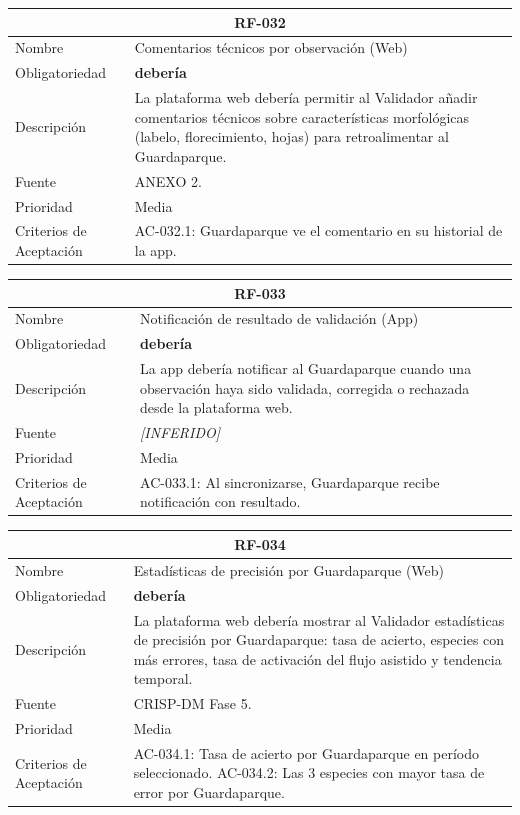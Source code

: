 \documentclass[12pt, a4paper]{article}
\newcommand{\inferido}{\textcolor{medio}{\textit{[INFERIDO]}}}
\begin{document}
\begin{longtable}{|p{3cm}|p{11.5cm}|}
\hline
\multicolumn{2}{|c|}{\textbf{RF-032}} \\
\hline
Nombre & Comentarios t\'ecnicos por observaci\'on (Web) \\
\hline
Obligatoriedad & \textbf{deber\'ia} \\
\hline
Descripci\'on & La plataforma web deber\'ia permitir al Validador a\~nadir comentarios t\'ecnicos sobre caracter\'isticas morfol\'ogicas (labelo, florecimiento, hojas) para retroalimentar al Guardaparque. \\
\hline
Fuente & ANEXO 2. \\
\hline
Prioridad & Media \\
\hline
Criterios de Aceptaci\'on &
AC-032.1: Guardaparque ve el comentario en su historial de la app. \\
\hline
\end{longtable}

\begin{longtable}{|p{3cm}|p{11.5cm}|}
\hline
\multicolumn{2}{|c|}{\textbf{RF-033}} \\
\hline
Nombre & Notificaci\'on de resultado de validaci\'on (App) \\
\hline
Obligatoriedad & \textbf{deber\'ia} \\
\hline
Descripci\'on & La app deber\'ia notificar al Guardaparque cuando una observaci\'on haya sido validada, corregida o rechazada desde la plataforma web. \\
\hline
Fuente & \inferido{} \\
\hline
Prioridad & Media \\
\hline
Criterios de Aceptaci\'on &
AC-033.1: Al sincronizarse, Guardaparque recibe notificaci\'on con resultado. \\
\hline
\end{longtable}

\begin{longtable}{|p{3cm}|p{11.5cm}|}
\hline
\multicolumn{2}{|c|}{\textbf{RF-034}} \\
\hline
Nombre & Estad\'isticas de precisi\'on por Guardaparque (Web) \\
\hline
Obligatoriedad & \textbf{deber\'ia} \\
\hline
Descripci\'on & La plataforma web deber\'ia mostrar al Validador estad\'isticas de precisi\'on por Guardaparque: tasa de acierto, especies con m\'as errores, tasa de activaci\'on del flujo asistido y tendencia temporal. \\
\hline
Fuente & CRISP-DM Fase 5. \\
\hline
Prioridad & Media \\
\hline
Criterios de Aceptaci\'on &
AC-034.1: Tasa de acierto por Guardaparque en per\'iodo seleccionado. \newline
AC-034.2: Las 3 especies con mayor tasa de error por Guardaparque. \\
\hline
\end{longtable}
\end{document}
